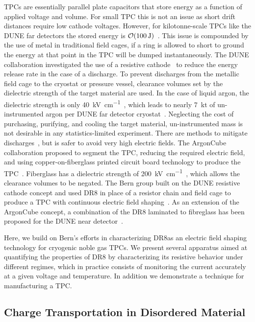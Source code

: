 \documentclass[a4paper,12pt]{article}
\newcommand{\DR}{DR8}
\begin{document}
TPCs are essentially parallel plate capacitors that store energy as a function of applied voltage and volume. 
For small TPC this is not an issue as short drift distances require low cathode voltages.
However, for kilotonne-scale TPCs like the DUNE far detectors the stored energy is $\order{\SI{100}{\joule}}$~\cite{Acciarri:2016ooe}.
This issue is compounded by the use of metal in traditional field cages, if a ring is allowed to short to ground the energy at that point in the TPC will be dumped instantaneously. 
The DUNE collaboration investigated the use of a resistive cathode~\cite{DUNE:2017pqt} to reduce the energy release rate in the case of a discharge.
To prevent discharges from the metallic field cage to the cryostat or pressure vessel, clearance volumes set by the dielectric strength of the target material are used. 
In the case of liquid argon, the dielectric strength is only \SI{40}{\kilo\volt\per\centi\metre}~\cite{MicroBooNE:2014php}, which leads to nearly \SI{7}{\kilo\tonne} of un-instrumented argon per DUNE far detector cryostat~\cite{Acciarri:2016ooe}.
Neglecting the cost of purchasing, purifying, and cooling the target material, un-instrumented mass is not desirable in any statistics-limited experiment.        
There are methods to mitigate discharges~\cite{Auger:2014eba}, but is safer to avoid very high electric fields.  
The ArgonCube collaboration proposed to segment the TPC, reducing the required electric field, and using copper-on-fiberglass printed circuit board technology to produce the TPC~\cite{Auger:2268439}. 
Fiberglass has a dielectric strength of \SI{200}{\kilo\volt\per\centi\metre}~\cite{5071132}, which allows the clearance volumes to be negated.
The Bern group built on the DUNE resistive cathode concept and used {\DR} in place of a resistor chain and field cage to produce a TPC with continuous electric field shaping~\cite{bern_lartpc}.
As an extension of the ArgonCube concept, a combination of the {\DR} laminated to fibreglass has been proposed for the DUNE near detector~\cite{DUNE:2021tad}.   

Here, we build on Bern's efforts in characterizing \DR as an electric field shaping technology for cryogenic noble gas TPCs.
We present several apparatus aimed at quantifying the properties of {\DR} by characterizing its resistive behavior under different regimes, which in practice consists of monitoring the current accurately at a given voltage and temperature. 
In addition we demonstrate a technique for manufacturing a TPC.

\subsection{Charge Transportation in Disordered Material}
\label{sec:disorder_Mattrial}
\end{document}
